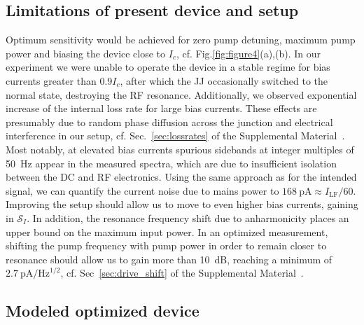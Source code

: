 \subsection{Limitations of present device and setup}\label{subsec:limitations}
% 
Optimum sensitivity would be achieved for zero pump detuning, maximum pump power and biasing the device close to $I_c$, cf. Fig.\ref{fig:figure4}(a),(b).
% 
In our experiment we were unable to operate the device in a stable regime for bias currents greater than $0.9 I_c$, after which the JJ occasionally switched to the normal state, destroying the RF resonance.
% 
Additionally, we observed exponential increase of the internal loss rate for large bias currents.
% 
These effects are presumably due to random phase diffusion across the junction and electrical interference in our setup, cf. Sec.~\ref{sec:lossrates} of the Supplemental Material~\cite{SeeSupplementalMaterial}.
% 
Most notably, at elevated bias currents spurious sidebands at integer multiples of \SI{50}{\hertz} appear in the measured spectra, which are due to insufficient isolation between the DC and RF electronics.
% 
Using the same approach as for the intended signal, we can quantify the current noise due to mains power to $\SI{168}{\pico\ampere}\approx I_\text{LF}/60$.
% 
Improving the setup should allow us to move to even higher bias currents, gaining in $\mathcal{S}_I$.
% 
In addition, the resonance frequency shift due to anharmonicity places an upper bound on the maximum input power.
% 
In an optimized measurement, shifting the pump frequency with pump power in order to remain closer to resonance should allow us to gain more than \SI{10}{dB}, reaching a minimum of $\SI{2.7}{\pico\ampere\per\hertz\tothe{1/2}}$, cf. Sec~\ref{sec:drive_shift} of the Supplemental Material~\cite{SeeSupplementalMaterial}.

\subsection{Modeled optimized device}

